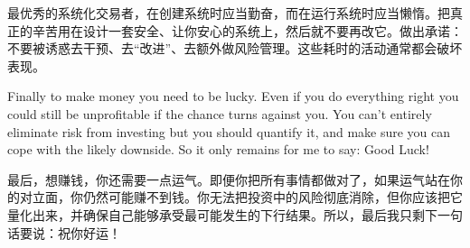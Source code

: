 \begin{chineseblock}最优秀的系统化交易者，在创建系统时应当勤奋，而在运行系统时应当懒惰。把真正的辛苦用在设计一套安全、让你安心的系统上，然后就不要再改它。做出承诺：不要被诱惑去干预、去“改进”、去额外做风险管理。这些耗时的活动通常都会破坏表现。\end{chineseblock}

\bipairgap

\begin{englishblock} Finally to make money you need to be lucky. Even if you do everything right you could still be unprofitable if the chance turns against you. You can't entirely eliminate risk from investing but you should quantify it, and make sure you can cope with the likely downside. So it only remains for me to say: Good Luck! \end{englishblock}

\begin{chineseblock}最后，想赚钱，你还需要一点运气。即便你把所有事情都做对了，如果运气站在你的对立面，你仍然可能赚不到钱。你无法把投资中的风险彻底消除，但你应该把它量化出来，并确保自己能够承受最可能发生的下行结果。所以，最后我只剩下一句话要说：祝你好运！\end{chineseblock}
